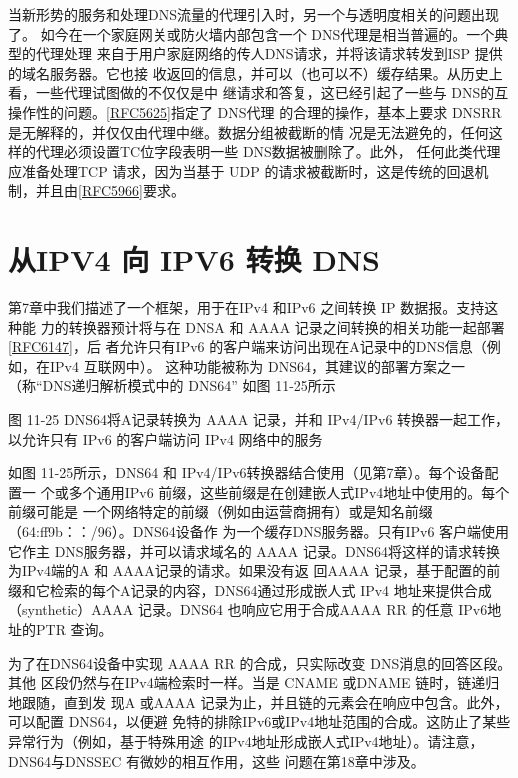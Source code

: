 当新形势的服务和处理DNS流量的代理引入时，另一个与透明度相关的问题出现了。
如今在一个家庭网关或防火墙内部包含一个 DNS代理是相当普遍的。一个典型的代理处理
来自于用户家庭网络的传人DNS请求，并将该请求转发到ISP 提供的域名服务器。它也接
收返回的信息，并可以（也可以不）缓存结果。从历史上看，一些代理试图做的不仅仅是中
继请求和答复，这已经引起了一些与
DNS的互操作性的问题。\href{https://www.rfc-editor.org/rfc/rfc5625}{[RFC5625]}指定了 DNS代理
的合理的操作，基本上要求 DNSRR 是无解释的，并仅仅由代理中继。数据分组被截断的情
况是无法避免的，任何这样的代理必须设置TC位字段表明一些 DNS数据被删除了。此外，
任何此类代理应准备处理TCP 请求，因为当基于 UDP 的请求被截断时，这是传统的回退机
制，并且由\href{https://www.rfc-editor.org/rfc/rfc5966}{[RFC5966]}要求。

\section{从IPV4 向 IPV6 转换 DNS}

第7章中我们描述了一个框架，用于在IPv4 和IPv6 之间转换 IP 数据报。支持这种能
力的转换器预计将与在 DNSA 和 AAAA
记录之间转换的相关功能一起部署\href{https://www.rfc-editor.org/rfc/rfc6147}{[RFC6147]}，后
者允许只有IPv6 的客户端来访问出现在A记录中的DNS信息（例如，在IPv4 互联网中）。
这种功能被称为 DNS64，其建议的部署方案之一（称“DNS递归解析模式中的 DNS64”
如图 11-25所示

图 11-25 DNS64将A记录转换为 AAAA 记录，并和 IPv4/IPv6 转换器一起工作，
以允许只有 IPv6 的客户端访问 IPv4 网络中的服务

如图 11-25所示，DNS64 和 IPv4/IPv6转换器结合使用（见第7章）。每个设备配置一
个或多个通用IPv6 前缀，这些前缀是在创建嵌人式IPv4地址中使用的。每个前缀可能是
一个网络特定的前缀（例如由运营商拥有）或是知名前缀（64:ff9b：：/96）。DNS64设备作
为一个缓存DNS服务器。只有IPv6 客户端使用它作主 DNS服务器，并可以请求域名的
AAAA 记录。DNS64将这样的请求转换为IPv4端的A 和 AAAA记录的请求。如果没有返
回AAAA 记录，基于配置的前缀和它检索的每个A记录的内容，DNS64通过形成嵌人式
IPv4 地址来提供合成（synthetic）AAAA 记录。DNS64 也响应它用于合成AAAA RR 的任意
IPv6地址的PTR 查询。

为了在DNS64设备中实现 AAAA RR 的合成，只实际改变 DNS消息的回答区段。其他
区段仍然与在IPv4端检索时一样。当是 CNAME 或DNAME 链时，链递归地跟随，直到发
现A 或AAAA 记录为止，并且链的元素会在响应中包含。此外，可以配置 DNS64，以便避
免特的排除IPv6或IPv4地址范围的合成。这防止了某些异常行为（例如，基于特殊用途
的IPv4地址形成嵌人式IPv4地址）。请注意，DNS64与DNSSEC 有微妙的相互作用，这些
问题在第18章中涉及。

